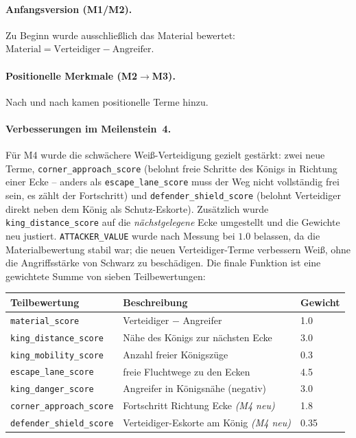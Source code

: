 \documentclass[11pt,a4paper]{article}
\newcommand{\code}[1]{\texttt{\small #1}}
\begin{document}
\paragraph{Anfangsversion (M1/M2).}
Zu Beginn wurde ausschlie\ss lich das Material bewertet:
$\text{Material} = \text{Verteidiger} - \text{Angreifer}$.

\paragraph{Positionelle Merkmale (M2$\rightarrow$M3).}
Nach und nach kamen positionelle Terme hinzu.

\paragraph{Verbesserungen im Meilenstein~4.}
F\"ur M4 wurde die schw\"achere Wei\ss-Verteidigung gezielt gest\"arkt: zwei neue
Terme, \code{corner\_approach\_score} (belohnt freie Schritte des K\"onigs in
Richtung einer Ecke -- anders als \code{escape\_lane\_score} muss der Weg nicht
vollst\"andig frei sein, es z\"ahlt der Fortschritt) und
\code{defender\_shield\_score} (belohnt Verteidiger direkt neben dem K\"onig als
Schutz-Eskorte).
Zus\"atzlich wurde \code{king\_distance\_score} auf die \emph{n\"achstgelegene}
Ecke umgestellt und die Gewichte neu justiert.
\code{ATTACKER\_VALUE} wurde nach Messung bei $1.0$ belassen, da die
Materialbewertung stabil war; die neuen Verteidiger-Terme verbessern Wei\ss,
ohne die Angriffsst\"arke von Schwarz zu besch\"adigen.
Die finale Funktion ist eine gewichtete Summe von sieben Teilbewertungen:

\begin{center}
\begin{tabular}{lll}
\toprule
\textbf{Teilbewertung} & \textbf{Beschreibung} & \textbf{Gewicht} \\
\midrule
\code{material\_score}        & Verteidiger $-$ Angreifer               & 1.0 \\
\code{king\_distance\_score}   & N\"ahe des K\"onigs zur n\"achsten Ecke & 3.0 \\
\code{king\_mobility\_score}   & Anzahl freier K\"onigsz\"uge            & 0.3 \\
\code{escape\_lane\_score}     & freie Fluchtwege zu den Ecken           & 4.5 \\
\code{king\_danger\_score}     & Angreifer in K\"onigsn\"ahe (negativ)   & 3.0 \\
\code{corner\_approach\_score} & Fortschritt Richtung Ecke \emph{(M4 neu)} & 1.8 \\
\code{defender\_shield\_score} & Verteidiger-Eskorte am K\"onig \emph{(M4 neu)} & 0.35 \\
\bottomrule
\end{tabular}
\end{center}
\end{document}
